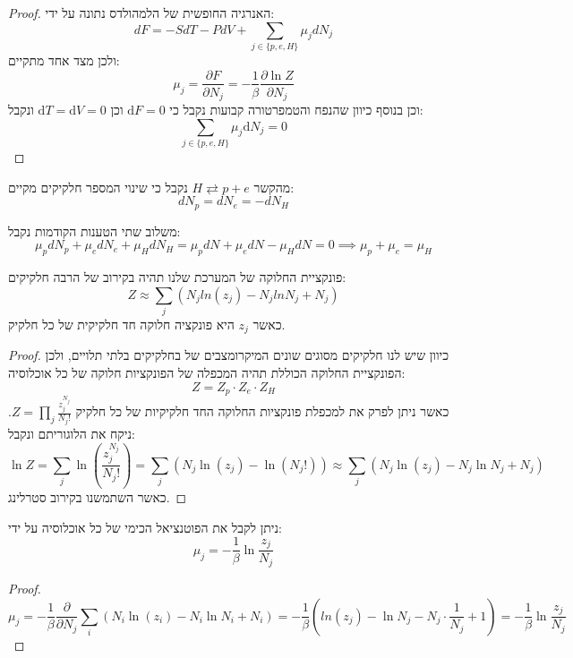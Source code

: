 \documentclass{tstextbook}
\begin{document}
\begin{proof}
האנרגיה החופשית של הלמהולדס נתונה על ידי:
$$d F=-S d T-P d V+\sum_{j\in\{ p,e,H \}}\mu_{j}d N_{j}$$
ולכן מצד אחד מתקיים:
$$\mu_{j}=\frac{\partial F}{\partial N_{j}}=-\frac{1}{\beta}\frac{\partial \ln Z}{\partial N_{j}}$$
וכן בנוסף כיוון שהנפח והטמפרטורה קבועות נקבל כי \(\mathrm{d}F=0\) וכן \(\mathrm{d}T=\mathrm{d}V=0\) ונקבל:
$$\sum_{j\in\{ p,e,H \}}\mu_{j}\mathrm{d}N_{j}=0$$

\end{proof}
\begin{proposition}
מהקשר \(H\rightleftarrows p+e\) נקבל כי שינוי המספר חלקיקים מקיים:
$$d N_{p}=d N_{e}=-d N_{H}$$

\end{proposition}
\begin{corollary}
משלוב שתי הטענות הקודמות נקבל:
$$\mu_{p}d N_{p}+\mu_{e}d N_{e}+\mu_{H}d N_{H}=\mu_{p}d N+\mu_{e}d N-\mu_{H}d N=0\implies \mu_{p}+\mu_{e}=\mu_{H}$$

\end{corollary}
\begin{lemma}
פונקציית החלוקה של המערכת שלנו תהיה בקירוב של הרבה חלקיקים:
$$Z\approx\sum_{j}\left(N_{j}l n\left(z_{j}\right)-N_{j}l n N_{j}+N_{j}\right)$$
כאשר \(z_{j}\) היא פונקציה חלוקה חד חלקיקית של כל חלקיק.

\end{lemma}
\begin{proof}
כיוון שיש לנו חלקיקים מסוגים שונים המיקרומצבים של בחלקיקים בלתי תלויים, ולכן הפונקציית החלוקה הכוללת תהיה המכפלה של הפונקציות חלוקה של כל אוכלוסיה:
$$Z=Z_{p}\cdot Z_{e}\cdot Z_{H}$$
כאשר ניתן לפרק את למכפלת פונקציות החלוקה החד חלקיקיות של כל חלקיק \(Z=\prod_{j} \frac{z_{j}^{N_{j}}}{N_{j}!}\). ניקח את הלוגוריתם ונקבל:
$$\ln Z=\sum_{j}\ln\left(\frac{z_{j}^{N_{j}}}{N_{j}!}\right)=\sum_{j}\left(N_{j}\ln\left(z_{j}\right)-\ln\left(N_{j}!\right)\right)\approx\sum_{j}\left(N_{j}\ln\left(z_{j}\right)-N_{j}\ln N_{j}+N_{j}\right)$$
כאשר השתמשנו בקירוב סטרלינג.

\end{proof}
\begin{corollary}
ניתן לקבל את הפוטנציאל הכימי של כל אוכלוסיה על ידי:
$$\mu_{j}=-\frac{1}{\beta}\ln \frac{z_{j}}{N_{j}}$$

\end{corollary}
\begin{proof}
$$\mu_{j}=-\frac{1}{\beta}\frac{\partial}{\partial N_{j}}\sum_{i}\left(N_{i}\ln\left(z_{i}\right)-N_{i}\ln N_{i}+N_{i}\right)=-\frac{1}{\beta}\left(l n\left(z_{j}\right)-\ln N_{j}-N_{j}\cdot\frac{1}{N_{j}}+1\right)=-\frac{1}{\beta}\ln\frac{z_{j}}{N_{j}}$$

\end{proof}
\end{document}
